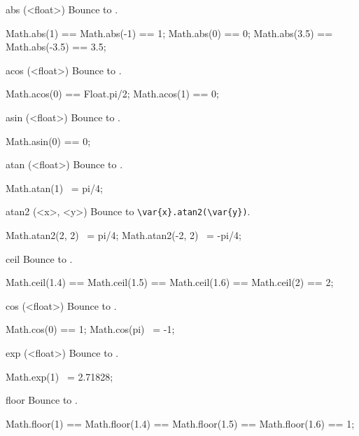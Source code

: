 \begin{urbiscriptapi}
\item[abs](<float>)%
  Bounce to .
\begin{urbiassert}
Math.abs(1) == Math.abs(-1) == 1;
Math.abs(0) == 0;
Math.abs(3.5) == Math.abs(-3.5) == 3.5;
\end{urbiassert}

\item[acos](<float>)%
  Bounce to .
\begin{urbiassert}
Math.acos(0) == Float.pi/2;
Math.acos(1) == 0;
\end{urbiassert}

\item[asin](<float>)%
  Bounce to .
\begin{urbiassert}
Math.asin(0) == 0;
\end{urbiassert}

\item[atan](<float>)%
  Bounce to .
\begin{urbiassert}
Math.atan(1) ~= pi/4;
\end{urbiassert}

\item[atan2](<x>, <y>)%
  Bounce to \lstinline|\var{x}.atan2(\var{y})|.
\begin{urbiassert}
Math.atan2(2, 2) ~= pi/4;
Math.atan2(-2, 2) ~= -pi/4;
\end{urbiassert}

\item[ceil] Bounce to .
\begin{urbiassert}
Math.ceil(1.4) == Math.ceil(1.5) ==  Math.ceil(1.6) == Math.ceil(2) == 2;
\end{urbiassert}

\item[cos](<float>)%
  Bounce to .
\begin{urbiassert}
Math.cos(0) == 1;
Math.cos(pi) ~= -1;
\end{urbiassert}

\item[exp](<float>)%
  Bounce to .
\begin{urbiassert}
Math.exp(1) ~= 2.71828;
\end{urbiassert}

\item[floor] Bounce to .
\begin{urbiassert}
Math.floor(1) == Math.floor(1.4) == Math.floor(1.5) ==  Math.floor(1.6) == 1;
\end{urbiassert}


\end{urbiscriptapi}

